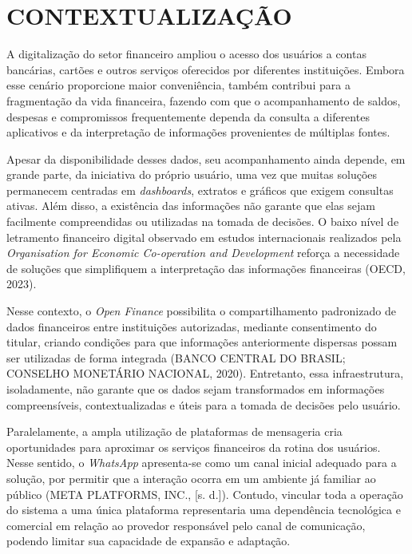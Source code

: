 \chapter{CONTEXTUALIZAÇÃO}

A digitalização do setor financeiro ampliou o acesso dos usuários a contas bancárias, cartões e outros serviços oferecidos por diferentes instituições. Embora esse cenário proporcione maior conveniência, também contribui para a fragmentação da vida financeira, fazendo com que o acompanhamento de saldos, despesas e compromissos frequentemente dependa da consulta a diferentes aplicativos e da interpretação de informações provenientes de múltiplas fontes.

Apesar da disponibilidade desses dados, seu acompanhamento ainda depende, em grande parte, da iniciativa do próprio usuário, uma vez que muitas soluções permanecem centradas em \textit{dashboards}, extratos e gráficos que exigem consultas ativas. Além disso, a existência das informações não garante que elas sejam facilmente compreendidas ou utilizadas na tomada de decisões. O baixo nível de letramento financeiro digital observado em estudos internacionais realizados pela \textit{Organisation for Economic Co-operation and Development} reforça a necessidade de soluções que simplifiquem a interpretação das informações financeiras (OECD, 2023).

Nesse contexto, o \textit{Open Finance} possibilita o compartilhamento padronizado de dados financeiros entre instituições autorizadas, mediante consentimento do titular, criando condições para que informações anteriormente dispersas possam ser utilizadas de forma integrada (BANCO CENTRAL DO BRASIL; CONSELHO MONETÁRIO NACIONAL, 2020). Entretanto, essa infraestrutura, isoladamente, não garante que os dados sejam transformados em informações compreensíveis, contextualizadas e úteis para a tomada de decisões pelo usuário.

Paralelamente, a ampla utilização de plataformas de mensageria cria oportunidades para aproximar os serviços financeiros da rotina dos usuários. Nesse sentido, o \textit{WhatsApp} apresenta-se como um canal inicial adequado para a solução, por permitir que a interação ocorra em um ambiente já familiar ao público (META PLATFORMS, INC., [s. d.]). Contudo, vincular toda a operação do sistema a uma única plataforma representaria uma dependência tecnológica e comercial em relação ao provedor responsável pelo canal de comunicação, podendo limitar sua capacidade de expansão e adaptação.

